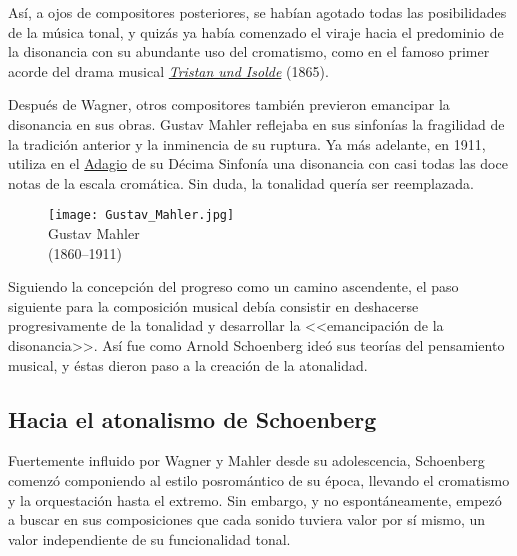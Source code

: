 As\'i, a ojos de compositores posteriores, se hab\'ian agotado todas las posibilidades de la m\'usica tonal, y quiz\'as ya hab\'ia comenzado el viraje hacia el predominio de la disonancia con su abundante uso del cromatismo, como en el famoso primer acorde del drama musical \href{https://www.youtube.com/watch?v=SF4zN-Okonc}{\textit{Tristan und Isolde}} (1865). %

Despu\'es de Wagner, otros compositores tambi\'en previeron emancipar la disonancia en sus obras. Gustav Mahler reflejaba en sus sinfon\'ias la fragilidad de la tradici\'on anterior y la inminencia de su ruptura. Ya m\'as adelante, en 1911, utiliza en el \href{https://www.youtube.com/watch?v=vHyV8noUXC0}{Adagio} de su D\'ecima Sinfon\'ia una disonancia con casi todas las doce notas de la escala crom\'atica. Sin duda, la tonalidad quer\'ia ser reemplazada.

\begin{figure}
\begin{center}
\texttt{[image: Gustav\_Mahler.jpg]}\\
{Gustav Mahler\\(1860--1911)}
\end{center}
\end{figure}

Siguiendo la concepci\'on del progreso como un camino ascendente, el paso siguiente para la composici\'on musical deb\'ia consistir en deshacerse progresivamente de la tonalidad y desarrollar la <<{emancipaci\'on de la disonancia}>>\footnotemark[3]. As\'i fue como Arnold Schoenberg ide\'o sus teor\'ias del pensamiento musical, y \'estas dieron paso a la creaci\'on de la atonalidad. \cite{kinney}

\subsection{Hacia el atonalismo de Schoenberg}
Fuertemente influido por Wagner y Mahler desde su adolescencia, Schoenberg comenz\'o componiendo al estilo posrom\'antico de su \'epoca, llevando el cromatismo y la orquestaci\'on hasta el extremo. Sin embargo, y no espont\'aneamente, empez\'o a buscar en sus composiciones que cada sonido tuviera valor por s\'i mismo, un valor independiente de su funcionalidad tonal.

